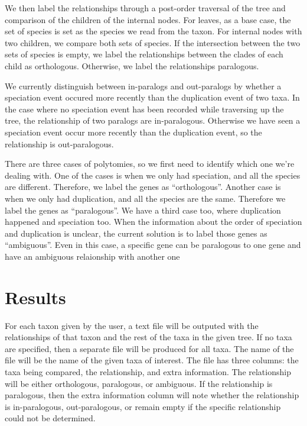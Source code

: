 \documentclass[
  11pt,
  letterpaper,
  oneside]{book}
\begin{document}
We then label the relationships through a post-order traversal of the
tree and comparison of the children of the internal nodes. For leaves,
as a base case, the set of species is set as the species we read from
the taxon. For internal nodes with two children, we compare both sets of
species. If the intersection between the two sets of species is empty,
we label the relationships between the clades of each child as
orthologous. Otherwise, we label the relationships paralogous.

We currently distinguish between in-paralogs and out-paralogs by whether
a speciation event occured more recently than the duplication event of
two taxa. In the case where no speciation event has been recorded while
traversing up the tree, the relationship of two paralogs are
in-paralogous. Otherwise we have seen a speciation event occur more
recently than the duplication event, so the relationship is
out-paralogous.

There are three cases of polytomies, so we first need to identify which
one we're dealing with. One of the cases is when we only had speciation,
and all the species are different. Therefore, we label the genes as
``orthologous''. Another case is when we only had duplication, and all
the species are the same. Therefore we label the genes as
``paralogous''. We have a third case too, where duplication happened and
speciation too. When the information about the order of speciation and
duplication is unclear, the current solution is to label those genes as
``ambiguous''. Even in this case, a specific gene can be paralogous to
one gene and have an ambiguous relaionship with another one

\hypertarget{results-1}{%
\section{Results}\label{results-1}}

For each taxon given by the user, a text file will be outputed with the
relationships of that taxon and the rest of the taxa in the given tree.
If no taxa are specified, then a separate file will be produced for all
taxa. The name of the file will be the name of the given taxa of
interest. The file has three columns: the taxa being compared, the
relationship, and extra information. The relationship will be either
orthologous, paralogous, or ambiguous. If the relationship is
paralogous, then the extra information column will note whether the
relationship is in-paralogous, out-paralogous, or remain empty if the
specific relationship could not be determined.
\end{document}

